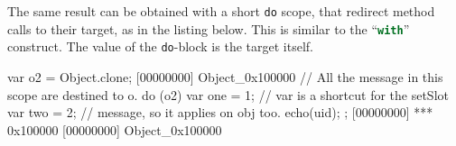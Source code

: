The same result can be obtained with a short \lstinline|do| scope,
that redirect method calls to their target, as in the listing
below. This is similar to the \pascal
``\lstinline[language=Pascal]{with}'' construct.  The value of the
\lstinline{do}-block is the target itself.

\begin{urbiscript}
var o2 = Object.clone;
[00000000] Object_0x100000
// All the message in this scope are destined to o.
do (o2)
{
  var one = 1; // var is a shortcut for the setSlot
  var two = 2; // message, so it applies on obj too.
  echo(uid);
};
[00000000] *** 0x100000
[00000000] Object_0x100000
\end{urbiscript}



